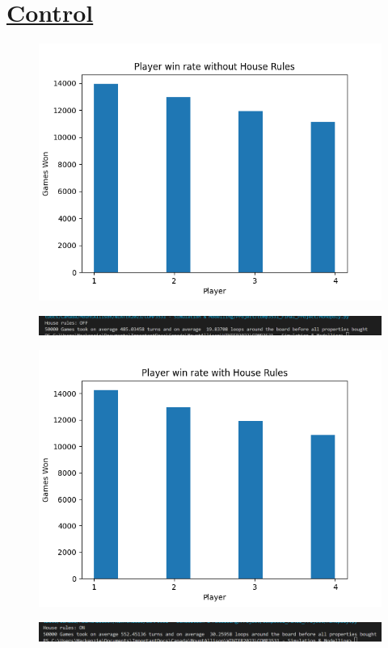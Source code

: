 \documentclass[a4paper,reqno,12pt]{report}
\begin{document}
\section*{\underline{Control}}
\begin{figure}[h]
\includegraphics[width=15cm]{houseRulesOFF_50turns_+1_50000games.png}
\centering
\end{figure}
\begin{figure}[h]
\includegraphics[width=15cm]{50000games_HouseRulesOFF_averages.png}
\centering
\end{figure}
\begin{figure}[h]
\includegraphics[width=15cm]{houseRulesON_50turns_+1_50000games.png}
\centering
\end{figure}
\begin{figure}[h]
\includegraphics[width=15cm]{50000games_HouseRulesON_averages.png}
\centering
\end{figure}
\clearpage
\end{document}
